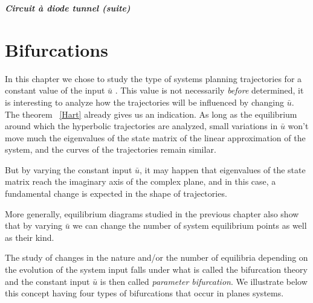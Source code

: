 {\begin{exemple}{\bf \em Circuit {à} diode tunnel (suite)}


\section{Bifurcations}

In this chapter we chose to study the type of systems planning trajectories for a constant 
value of the input $\bar u$ . This value is not necessarily {\em before} determined, 
it is interesting to analyze how the trajectories will be influenced by changing $\bar u$.
The theorem ~\ref{Hart} already gives us an indication. As long as the equilibrium around
which the hyperbolic trajectories are analyzed, small variations in $\bar u$
won't move much the eigenvalues of the state matrix of the linear approximation
of the system, and the curves of the trajectories remain similar.

But by varying the constant input $\bar u$, it may happen that eigenvalues of the state matrix 
reach the imaginary axis of the complex plane, and
in this case, a fundamental change is expected in the shape of trajectories.

More generally, equilibrium diagrams studied in the previous chapter also show that by
varying $\bar u$ we can change the number of system equilibrium points as well as their kind.

The study of changes in the nature and/or the number of
equilibria depending on the evolution of the system input
falls under what is called the bifurcation theory and the constant input $\bar u$ is then
called {\em parameter bifurcation}. We illustrate below this concept
having four types of bifurcations that occur in planes systems.


\end{exemple}}
